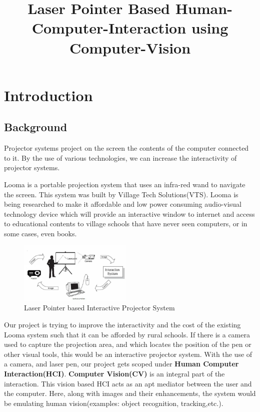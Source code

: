 \documentclass[12pt, a4paper]{article}
\title{\textbf{Laser Pointer Based Human-Computer-Interaction using Computer-Vision}}
\begin{document}
	\listoffigures
	\newpage
	\tableofcontents 
	\newpage

\section{Introduction}
\subsection{Background}
Projector systems project on the screen the contents of the computer connected to it. By the use of various technologies, we can increase the interactivity of projector systems. 

Looma is a portable projection system that uses an infra-red wand to navigate the screen. This system was built by Village Tech Solutions(VTS). Looma is being researched to make it affordable and low power consuming audio-visual technology device which will provide an interactive window to internet and access to educational contents to village schools that have never seen computers, or in some cases, even books. 

\begin{figure}
	\centering
		\includegraphics[width=0.48\textwidth]{abc.jpg}
	\caption{Laser Pointer based Interactive Projector System}
\end{figure}

Our project is trying to improve the interactivity and the cost of the existing Looma system such that it can be afforded by rural schools. If there is a camera used to capture the projection area, and which locates the position of the pen or other visual tools, this would be an interactive projector system. With the use of a camera, and laser pen, our project gets scoped under \textbf{Human Computer Interaction(HCI)}. \textbf{Computer Vision(CV)} is an integral part of the interaction. This vision based HCI acts as an apt mediator between the user and the computer. Here, along with images and their enhancements, the system would be emulating human vision(examples: object recognition, tracking,etc.).
\end{document}
